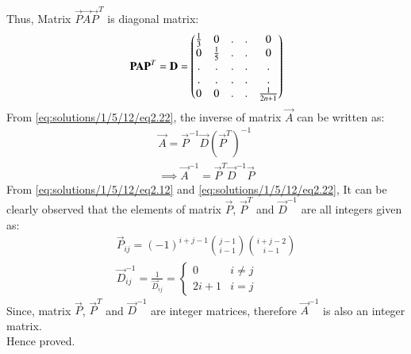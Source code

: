 Thus, Matrix $\vec{P}\vec{A}\vec{P}^T$ is diagonal matrix:
\begin{align}
    \mathbf{P}\mathbf{A}\mathbf{P}^T=\mathbf{D}=\begin{pmatrix}\frac{1}{3} & 0 &.&.&0\\
    0 & \frac{1}{5} &.&.&0\\
    .&.&.&.&.\\.&.&.&.&.\\0 &0 &.&.&\frac{1}{2n+1}\end{pmatrix} \label{eq:solutions/1/5/12/eq2.22}
\end{align}
From \eqref{eq:solutions/1/5/12/eq2.22}, the inverse of matrix $\vec{A}$ can be written as:
\begin{align}
    \vec{A}=\vec{P}^{-1}\vec{D}(\vec{P}^T)^{-1}\\
    \implies \vec{A}^{-1}=\vec{P}^T\vec{D}^{-1}\vec{P}
\end{align}
From \eqref{eq:solutions/1/5/12/eq2.12} and \eqref{eq:solutions/1/5/12/eq2.22}, It can be clearly observed that the elements of matrix $\vec{P}$, $\vec{P}^T$ and $\vec{D}^{-1}$ are all integers given as:
\begin{align}
    \vec{P}_{ij}=(-1)^{i+j-1} {j-1 \choose i-1} {i+j-2 \choose i-1} \\
    \vec{D}^{-1}_{ij}=\frac{1}{\vec{D}_{ij}}=   \left\{\begin{matrix}
    0 & i\neq j\\ 
    2i+1 & i=j
    \end{matrix}\right.
\end{align}
Since, matrix $\vec{P}$, $\vec{P}^T$ and $\vec{D}^{-1}$ are integer matrices, therefore $\vec{A}^{-1}$ is also an integer matrix.\\
Hence proved.\\

